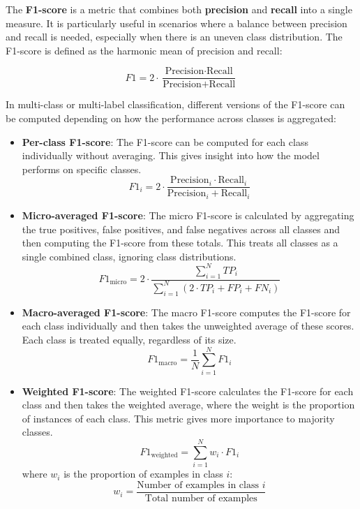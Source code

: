 \begin{itemize}
The \textbf{F1-score} is a metric that combines both \textbf{precision} and \textbf{recall} into a single measure. It is particularly useful in scenarios where a balance between precision and recall is needed, especially when there is an uneven class distribution. The F1-score is defined as the harmonic mean of precision and recall:

\[
    F1 = 2 \cdot \frac{\text{Precision} \cdot \text{Recall}}{\text{Precision} + \text{Recall}}
    \label{eq:f1score}
\]

In multi-class or multi-label classification, different versions of the F1-score can be computed depending on how the performance across classes is aggregated:

\begin{itemize}
    \item \textbf{Per-class F1-score}:
    The F1-score can be computed for each class individually without averaging. This gives insight into how the model performs on specific classes.
    \[
        F1_i = 2 \cdot \frac{\text{Precision}_i \cdot \text{Recall}_i}{\text{Precision}_i + \text{Recall}_i}
    \]
    \item \textbf{Micro-averaged F1-score}: 
    The micro F1-score is calculated by aggregating the true positives, false positives, and false negatives across all classes and then computing the F1-score from these totals. This treats all classes as a single combined class, ignoring class distributions.
    \[
        F1_{\text{micro}} = 2 \cdot \frac{\sum_{i=1}^{N} TP_i}{\sum_{i=1}^{N} (2 \cdot TP_i + FP_i + FN_i)}
    \]

    \item \textbf{Macro-averaged F1-score}:
    The macro F1-score computes the F1-score for each class individually and then takes the unweighted average of these scores. Each class is treated equally, regardless of its size.
    \[
        F1_{\text{macro}} = \frac{1}{N} \sum_{i=1}^{N} F1_i
    \]

    \item \textbf{Weighted F1-score}:
    The weighted F1-score calculates the F1-score for each class and then takes the weighted average, where the weight is the proportion of instances of each class. This metric gives more importance to majority classes.
    \[
        F1_{\text{weighted}} = \sum_{i=1}^{N} w_i \cdot F1_i
    \]
    where $w_i$ is the proportion of examples in class $i$:
    \[
        w_i = \frac{\text{Number of examples in class } i}{\text{Total number of examples}}
    \]
\end{itemize}


\end{itemize}
